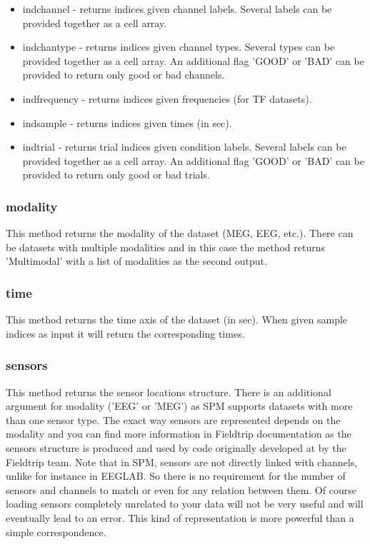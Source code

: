 \begin{itemize}
\item indchannel - returns indices given channel labels. Several labels can be provided together as a cell array. 
\item indchantype - returns indices given channel types. Several types can be provided together as a cell array. An additional flag 'GOOD' or 'BAD' can be provided to return only good or bad channels.
\item indfrequency - returns indices given frequencies (for TF datasets).
\item indsample -  returns indices given times (in sec).
\item indtrial - returns trial indices given condition labels. Several labels can be provided together as a cell array. An additional flag 'GOOD' or 'BAD' can be provided to return only good or bad trials.
\end{itemize}

\subsubsection{modality}
This method returns the modality of the dataset (MEG, EEG, etc.). There can be datasets with multiple modalities and in this case the method returns 'Multimodal' with a list of modalities as the second output. 

\subsubsection{time}
This method returns the time axis of the dataset (in sec). When given sample indices as input it will return the corresponding times. 

\subsubsection{sensors}
This method returns the sensor locations structure. There is an additional argument for modality ('EEG' or 'MEG') as SPM supports datasets with more than one sensor type. The exact way sensors are represented depends on the modality and you can find more information in Fieldtrip documentation as the sensors structure is produced and used by code originally developed at by the Fieldtrip team. Note that in SPM, sensors are not directly linked with channels, unlike for instance in EEGLAB. So there is no requirement for the number of sensors and channels to match or even for any relation between them. Of course loading sensors completely unrelated to your data will not be very useful and will eventually lead to an error. This kind of representation is more powerful than a simple correspondence.

